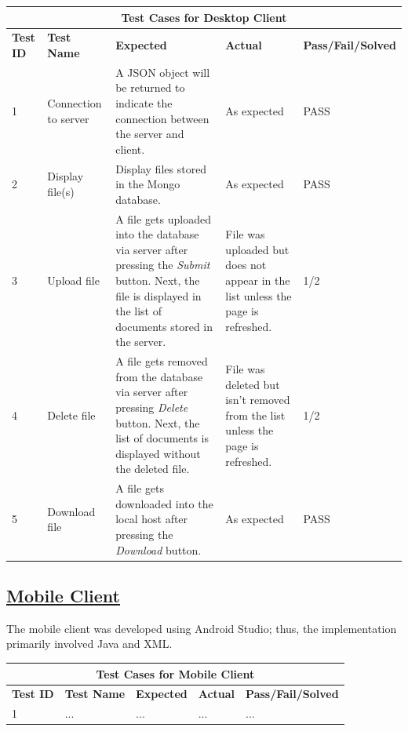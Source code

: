 \documentclass{article}
\begin{document}
\begin{tabular}{|p{2cm}|p{2cm}|p{3cm}|p{3cm}|p{3cm}|}
\hline
\multicolumn{5}{|c|}{\textbf{Test Cases for Desktop Client}} \\
\hline
\textbf{Test ID} & \textbf{Test Name} & \textbf{Expected} & \textbf{Actual} & \textbf{Pass/Fail/Solved} \\
\hline
1 & Connection to server & A JSON object will be returned to indicate the connection between the server and client.  & As expected & PASS \\
\hline
2 & Display file(s) & Display files stored in the Mongo database. & As expected & PASS \\
\hline
3 & Upload file & A file gets uploaded into the database via server after pressing the \textit{Submit} button. Next, the file is displayed in the list of documents stored in the server. & File was uploaded but does not appear in the list unless the page is refreshed. & 1/2 \\
\hline
4 & Delete file & A file gets removed from the database via server after pressing \textit{Delete} button. Next, the list of documents is displayed without the deleted file. & File was deleted but isn't removed from the list unless the page is refreshed. & 1/2 \\
\hline
5 & Download file & A file gets downloaded into the local host after pressing the \textit{Download} button. & As expected & PASS \\
\hline
\end{tabular}

\subsection{\underline{Mobile Client}}
The mobile client was developed using Android Studio; thus, the implementation primarily involved Java and XML.

\begin{tabular}{|p{2cm}|p{2cm}|p{3cm}|p{3cm}|p{3cm}|}
\hline
\multicolumn{5}{|c|}{\textbf{Test Cases for Mobile Client}} \\
\hline
\textbf{Test ID} & \textbf{Test Name} & \textbf{Expected} & \textbf{Actual} & \textbf{Pass/Fail/Solved} \\
\hline
1 & ... & ... & ... & ... \\
\hline
\end{tabular}
\end{document}
